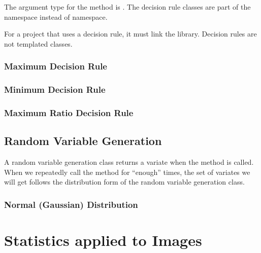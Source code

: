The argument type for the  method is
. The decision rule classes are part of the
 namespace instead of  namespace.

For a project that uses a decision rule, it must link the 
library. Decision rules are not templated classes.

\subsubsection{Maximum Decision Rule}
\label{sec:MaximumDecisionRule}

\ifitkFullVersion 

\fi

\subsubsection{Minimum Decision Rule}
\label{sec:MinimumDecisionRule}

\ifitkFullVersion 

\fi

\subsubsection{Maximum Ratio Decision Rule}
\label{sec:MaximumRatioDecisionRule}



\subsection{Random Variable Generation}
\label{sec:RandomVariableGeneration}

A random variable generation class returns a variate when the
 method is called. When we repeatedly call the method
for ``enough'' times, the set of variates we will get follows
the distribution form of the random variable generation class.
 
\subsubsection{Normal (Gaussian) Distribution}
\label{sec:NormalVariateGeneration}

\ifitkFullVersion 

\fi


\section{Statistics applied to Images}
\label{sec:StatisticsAppliedToImages}

